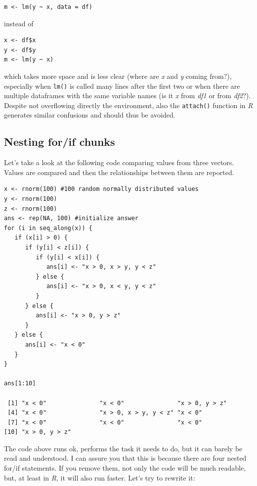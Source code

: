 \documentclass{book}
\begin{document}
\begin{lstlisting}[showstringspaces=false]
m <- lm(y ~ x, data = df)
\end{lstlisting}

instead of 

\begin{lstlisting}[showstringspaces=false]
x <- df$x
y <- df$y
m <- lm(y ~ x)
\end{lstlisting}

which takes more space and is less clear (where are \textit{x} and \textit{y} coming from?), especially when \texttt{lm()} is called many lines after the first two or when there are multiple dataframes with the same variable names (is it \textit{x} from \textit{df1} or from \textit{df2}?). Despite not overflowing directly the environment, also the \texttt{attach()} function in \textit{R} generates similar confusions and should thus be avoided.

\subsection{Nesting for/if chunks}
Let's take a look at the following code comparing values from three vectors. Values are compared and then the relationships between them are reported.

\begin{lstlisting}[showstringspaces=false]
x <- rnorm(100) #100 random normally distributed values
y <- rnorm(100)
z <- rnorm(100)
ans <- rep(NA, 100) #initialize answer
for (i in seq_along(x)) {
   if (x[i] > 0) {
      if (y[i] < z[i]) {
         if (y[i] < x[i]) {
            ans[i] <- "x > 0, x > y, y < z"
         } else {
            ans[i] <- "x > 0, x < y, y < z"
         }
      } else {
         ans[i] <- "x > 0, y > z"
      }
   } else {
      ans[i] <- "x < 0"
   }
}

ans[1:10]

 [1] "x < 0"               "x < 0"               "x > 0, y > z"       
 [4] "x < 0"               "x > 0, x > y, y < z" "x < 0"              
 [7] "x < 0"               "x < 0"               "x < 0"              
[10] "x > 0, y > z"   
\end{lstlisting}

The code above runs ok, performs the task it needs to do, but it can barely be read and understood. I can assure you that this is because there are four nested for/if statements. If you remove them, not only the code will be much readable, but, at least in \textit{R}, it will also run faster. Let's try to rewrite it:
\end{document}
